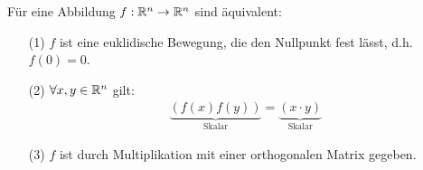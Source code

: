 \begin{satz} %
\label{satz321}
Für eine Abbildung $f: \mathbb{R}^n \rightarrow \mathbb{R}^n$ sind äquivalent:
\begin{itemize}
\item[(1)] $f$ ist eine euklidische Bewegung, die den Nullpunkt fest lässt, d.h. $f(0) = 0$.
\item[(2)] $\forall x, y \in \mathbb{R}^n$ gilt:
\begin{align}
\underbrace{(f(x) f(y))}_{\text{Skalar}} = \underbrace{(x \cdot y)}_{\text{Skalar}}
\end{align}
\item[(3)] $f$ ist durch Multiplikation mit einer orthogonalen Matrix gegeben.
\end{itemize}
\end{satz}

